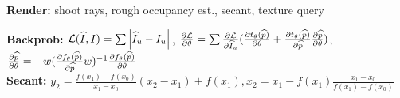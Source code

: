 \textbf{Render:} shoot rays, rough occupancy est., secant, texture query\\

\textbf{Backprob:} $\mathcal{L}(\widehat{I}, I) = \sum \left\lvert \widehat{I}_u - I_u \right\rvert$, $\frac{\partial \mathcal{L}}{\partial \theta} = \sum \frac{\partial \mathcal{L}}{\partial \widehat{I}_u} (\frac{\partial t_\theta (\widehat{p})}{\partial \theta} + \frac{\partial t_\theta(\widehat{p})}{\partial \widehat{p}} \frac{\partial \widehat{p}}{\partial \theta})$,
$\frac{\partial \widehat{p}}{\partial \theta} = -w(\frac{\partial f_\theta(\widehat{p})}{\partial \widehat{p}} w)^{-1} \frac{\partial f_\theta(\widehat{p})}{\partial \theta}$\\

\textbf{Secant:} $y_2 = \frac{f(x_1) - f(x_0)}{x_1 - x_0}(x_2 - x_1) + f(x_1), x_2 = x_1 - f(x_1) \frac{x_1 - x_0}{f(x_1) - f(x_0)}$\\

